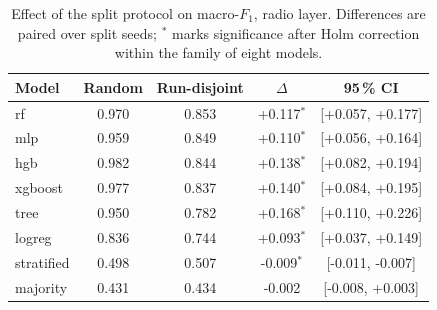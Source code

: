 \begin{table}[t]
\caption{Effect of the split protocol on macro-$F_{1}$, \DA{} radio layer.
Differences are paired over  split seeds; $^{\ast}$ marks
significance after Holm correction within the family of eight models.}
\label{tab:m_leakage}
\centering
\begin{tabular}{lcccc}
\toprule
Model & Random & Run-disjoint & $\Delta$ & 95\,\% CI \\
\midrule
rf & 0.970 & 0.853 & +0.117$^{\ast}$ & [+0.057, +0.177] \\
mlp & 0.959 & 0.849 & +0.110$^{\ast}$ & [+0.056, +0.164] \\
hgb & 0.982 & 0.844 & +0.138$^{\ast}$ & [+0.082, +0.194] \\
xgboost & 0.977 & 0.837 & +0.140$^{\ast}$ & [+0.084, +0.195] \\
tree & 0.950 & 0.782 & +0.168$^{\ast}$ & [+0.110, +0.226] \\
logreg & 0.836 & 0.744 & +0.093$^{\ast}$ & [+0.037, +0.149] \\
stratified & 0.498 & 0.507 & -0.009$^{\ast}$ & [-0.011, -0.007] \\
majority & 0.431 & 0.434 & -0.002 & [-0.008, +0.003] \\
\bottomrule
\end{tabular}
\end{table}
